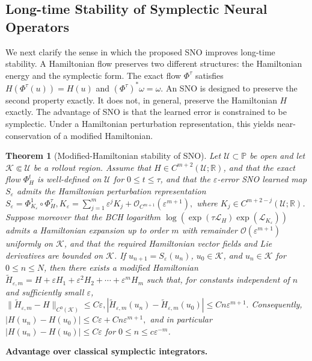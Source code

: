 \documentclass{article}
\theoremstyle{plain}
\newtheorem{theorem}{Theorem}[section]
\theoremstyle{definition}
\theoremstyle{remark}
\newcommand{\bbR}{\mathbb{R}}
\newcommand{\bbP}{\mathbb{P}}
\begin{document}
\subsection{Long-time Stability of Symplectic Neural Operators}
We next clarify the sense in which the proposed SNO improves long-time stability.
A Hamiltonian flow preserves two different structures: the Hamiltonian energy and the symplectic
form. The exact flow \(\Phi^\tau\) satisfies
\(
    H(\Phi^\tau(u)) = H(u)
\)
and    
\(
    (\Phi^\tau)^*\omega = \omega.
\)
An SNO is designed to preserve the second property exactly. It does not, in general, preserve the
Hamiltonian \(H\) exactly.  The advantage of SNO is that
the learned error is constrained to be symplectic. Under a Hamiltonian perturbation
representation, this yields near-conservation of a modified Hamiltonian.
\begin{theorem}[Modified-Hamiltonian stability of SNO]\label{thm:sno_modified_hamiltonian}
Let $\mathcal{U}\subset\bbP$ be open and let $\mathcal{K}\Subset\mathcal{U}$ be a rollout
region. Assume that
$H\in C^{m+2}(\mathcal{U};\bbR)$, and that the exact flow $\Phi_H^t$ is well-defined on $\mathcal{U}$ for
$0\le t\le \tau$, and that the $\varepsilon$-error SNO learned map $S_\varepsilon$ admits the Hamiltonian
perturbation representation
\(
    S_\varepsilon=\Phi_{K_\varepsilon}^1\circ \Phi_H^\tau,
    K_\varepsilon=\sum_{j=1}^m \varepsilon^j K_j+\mathcal{O}_{C^{m+1}}(\varepsilon^{m+1}),
\)
where $K_j\in C^{m+2-j}(\mathcal{U};\bbR)$. Suppose moreover that the BCH logarithm
$\log(\exp(\tau\mathcal{L}_H)\exp(\mathcal{L}_{K_\varepsilon}))$ admits a Hamiltonian expansion up to order $m$
with remainder $\mathcal{O}(\varepsilon^{m+1})$ uniformly on $\mathcal{K}$, and that the required
Hamiltonian vector fields and Lie derivatives are bounded on $\mathcal{K}$. If
$u_{n+1}=S_\varepsilon(u_n)$, $u_0\in\mathcal{K}$, and $u_n\in\mathcal{K}$ for $0\le n\le N$, then there
exists a modified Hamiltonian
\(
    \widetilde H_{\varepsilon,m}
    =H+\varepsilon H_1+\varepsilon^2H_2+\cdots+\varepsilon^mH_m
\)
such that, for constants independent of $n$ and sufficiently small $\varepsilon$,
\(
    \|\widetilde H_{\varepsilon,m}-H\|_{C^0(\mathcal{K})}\le C\varepsilon,
    |\widetilde H_{\varepsilon,m}(u_n)-\widetilde H_{\varepsilon,m}(u_0)|
    \le Cn\varepsilon^{m+1}.
\)
Consequently,
\(
    |H(u_n)-H(u_0)|\le C\varepsilon+Cn\varepsilon^{m+1},
\)
and in particular $|H(u_n)-H(u_0)|\le C\varepsilon$ for $0\le n\le c\varepsilon^{-m}$.
\end{theorem}
\textbf{Advantage over classical symplectic integrators.}
\end{document}
